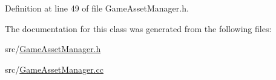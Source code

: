 Definition at line 49 of file Game\+Asset\+Manager.\+h.



The documentation for this class was generated from the following files\+:\begin{DoxyCompactItemize}
\item 
src/\hyperlink{_game_asset_manager_8h}{Game\+Asset\+Manager.\+h}\item 
src/\hyperlink{_game_asset_manager_8cc}{Game\+Asset\+Manager.\+cc}\end{DoxyCompactItemize}
